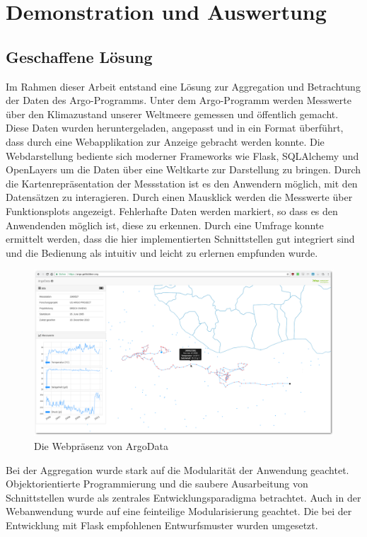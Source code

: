 \section{Demonstration und Auswertung}


\subsection{Geschaffene Lösung}

Im Rahmen dieser Arbeit entstand eine Lösung zur Aggregation und Betrachtung der Daten des Argo-Programms. Unter dem Argo-Programm werden Messwerte über den Klimazustand unserer Weltmeere gemessen und öffentlich gemacht. Diese Daten wurden heruntergeladen, angepasst und in ein Format überführt, dass durch eine Webapplikation zur Anzeige gebracht werden konnte. Die Webdarstellung bediente sich moderner Frameworks wie Flask, SQLAlchemy und OpenLayers um die Daten über eine Weltkarte zur Darstellung zu bringen. Durch die Kartenrepräsentation der Messstation ist es den Anwendern möglich, mit den Datensätzen zu interagieren. Durch einen Mausklick werden die Messwerte über Funktionsplots angezeigt.  Fehlerhafte Daten werden markiert, so dass es den Anwendenden möglich ist, diese zu erkennen. Durch eine Umfrage konnte ermittelt werden, dass die hier implementierten Schnittstellen gut integriert sind und die Bedienung als intuitiv und leicht zu erlernen empfunden wurde.

\begin{figure}[H]
 \centering
 \includegraphics[width=\textwidth]{pix/argodata_complete.png}
 \caption{Die Webpräsenz von ArgoData}
 \label{fig:argodataWeb}
\end{figure}

Bei der Aggregation wurde stark auf die Modularität der Anwendung geachtet. Objektorientierte Programmierung und die saubere Ausarbeitung von Schnittstellen wurde als zentrales Entwicklungsparadigma betrachtet. Auch in der Webanwendung wurde auf eine feinteilige Modularisierung geachtet. Die bei der Entwicklung mit Flask empfohlenen Entwurfsmuster wurden umgesetzt.


